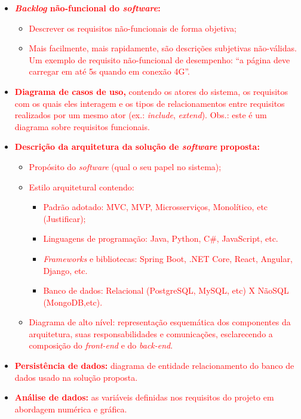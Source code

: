 \begin{itemize}
    \item \textcolor{red}{\textbf{ \textit{Backlog} não-funcional do \textit{software}:}}
    \begin{itemize}
        \item \textcolor{red}{ Descrever os requisitos não-funcionais de forma objetiva;}
        \item \textcolor{red}{ Mais facilmente, mais rapidamente, são descrições subjetivas não-válidas. Um exemplo de requisito não-funcional de desempenho: ``a página deve carregar em até 5s quando em conexão 4G''. }
    \end{itemize}
    \item \textcolor{red}{ \textbf{Diagrama de casos de uso,} contendo os atores do sistema, os requisitos com os quais eles interagem e os tipos de relacionamentos entre requisitos realizados por um mesmo ator (ex.: \textit{include}, \textit{extend}). Obs.: este é um diagrama sobre requisitos funcionais.}
    \item \textcolor{red}{ \textbf{Descrição da arquitetura da solução de \textit{software} proposta:}}
    \begin{itemize}
        \item \textcolor{red}{ Propósito do \textit{software} (qual o seu papel no sistema);}
        \item \textcolor{red}{ Estilo arquitetural contendo:}
        \begin{itemize}
            \item \textcolor{red}{ Padrão adotado: MVC, MVP, Microsserviços, Monolítico, etc (Justificar);}
            \item \textcolor{red}{ Linguagens de programação: Java, Python, C\#, JavaScript, etc.}
            \item \textcolor{red}{ \textit{Frameworks} e bibliotecas: Spring Boot, .NET Core, React, Angular, Django, etc.}
            \item \textcolor{red}{ Banco de dados: Relacional (PostgreSQL, MySQL, etc) X NãoSQL (MongoDB,etc). }
        \end{itemize}
        \item \textcolor{red}{ Diagrama de alto nível: representação esquemática dos componentes da arquitetura, suas responsabilidades e comunicações, esclarecendo a composição do \textit{front-end} e do \textit{back-end}.}
    \end{itemize}
    \item \textcolor{red}{ \textbf{Persistência de dados:} diagrama de entidade relacionamento do banco de dados usado na solução proposta.}
    \item \textcolor{red}{ \textbf{Análise de dados:} as variáveis definidas nos requisitos do projeto em abordagem numérica e gráfica.}
    



\end{itemize}
